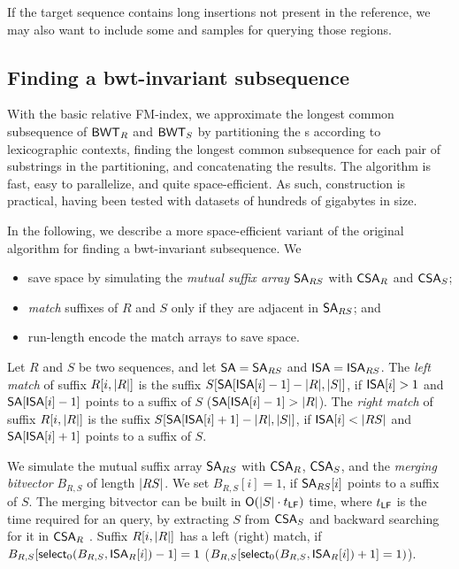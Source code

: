 If the target sequence contains long
insertions not present in the reference, we may also want to include
some \SA{} and \ISA{} samples for querying those regions.

\subsection{Finding a bwt-invariant subsequence}

With the basic relative FM-index, we approximate the longest common
subsequence of $\mathsf{BWT}_{R}$ and $\mathsf{BWT}_{S}$ by partitioning the \BWT{}s according
to lexicographic contexts, finding the longest common subsequence for each
pair of substrings in the partitioning, and concatenating the results. The
algorithm is fast, easy to parallelize, and quite space-efficient. As such,
\RFM{} construction is practical, having been tested with datasets of hundreds
of gigabytes in size.

In the following, we describe a more space-efficient variant of the original
algorithm \cite{Belazzougui2014} for finding a bwt-invariant subsequence. We
\begin{itemize}
\item save space by simulating the \emph{mutual suffix array} $\mathsf{SA}_{RS}$ with
$\mathsf{CSA}_{R}$ and $\mathsf{CSA}_{S}$;
\item \emph{match} suffixes of $R$ and $S$ only if they are adjacent in
$\mathsf{SA}_{RS}$; and
\item run-length encode the match arrays to save space.
\end{itemize}

\begin{definition}
Let $R$ and $S$ be two sequences, and let $\mathsf{SA} = \mathsf{SA}_{RS}$ and $\mathsf{ISA} =
\mathsf{ISA}_{RS}$. The \emph{left match} of suffix $R[i,\lvert R \rvert]$ is the suffix
$S[\mathsf{SA}[\mathsf{ISA}[i]-1] - \lvert R \rvert, \lvert S \rvert]$, if $\mathsf{ISA}[i] > 1$ and
$\mathsf{SA}[\mathsf{ISA}[i]-1]$ points to a suffix of $S$ ($\mathsf{SA}[\mathsf{ISA}[i]-1] > \lvert R \rvert$).
The \emph{right match} of suffix $R[i,\lvert R \rvert]$ is the suffix
$S[\mathsf{SA}[\mathsf{ISA}[i]+1] - \lvert R \rvert, \lvert S \rvert]$, if $\mathsf{ISA}[i] < \lvert RS \rvert$ and
$\mathsf{SA}[\mathsf{ISA}[i]+1]$ points to a suffix of $S$.
\end{definition}

We simulate the mutual suffix array $\mathsf{SA}_{RS}$ with $\mathsf{CSA}_{R}$, $\mathsf{CSA}_{S}$,
and the \emph{merging bitvector} $B_{R,S}$ of length $\lvert RS \rvert$. We set
$B_{R,S}[i] = 1$, if $\mathsf{SA}_{RS}[i]$ points to a suffix of $S$. The merging
bitvector can be built in $\mathsf{O}(\lvert S \rvert \cdot t_{\mathsf{LF}})$ time, where $t_{\mathsf{LF}}$ is
the time required for an \LF{} query, by extracting $S$ from $\mathsf{CSA}_{S}$ and
backward searching for it in $\mathsf{CSA}_{R}$ \cite{Siren2009}. Suffix
$R[i,\lvert R \rvert]$ has a left (right) match, if $B_{R,S}[\mathsf{select}_{0}(B_{R,S},
\mathsf{ISA}_{R}[i])-1] = 1$ ($B_{R,S}[\mathsf{select}_{0}(B_{R,S}, \mathsf{ISA}_{R}[i])+1] = 1)$).


